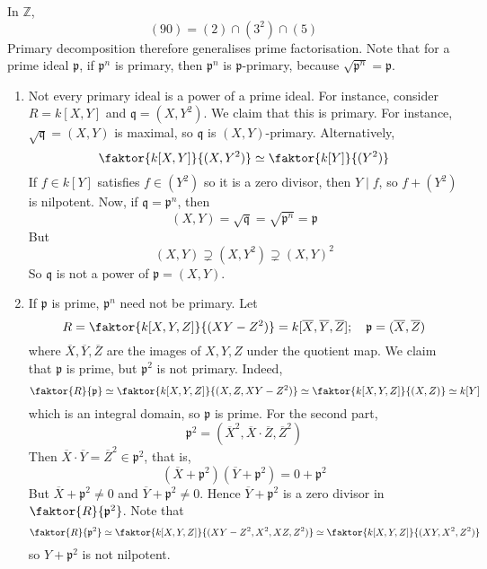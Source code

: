 In \( \mathbb Z \),
\[ (90) = (2) \cap (3^2) \cap (5) \]
Primary decomposition therefore generalises prime factorisation.
Note that for a prime ideal \( \mathfrak p \), if \( \mathfrak p^n \) is primary, then \( \mathfrak p^n \) is \( \mathfrak p \)-primary, because \( \sqrt{\mathfrak p^n} = \mathfrak p \).
\begin{example}
    \begin{enumerate}
        \item Not every primary ideal is a power of a prime ideal.
        For instance, consider \( R = k[X, Y] \) and \( \mathfrak q = (X, Y^2) \).
        We claim that this is primary.
        For instance, \( \sqrt{\mathfrak q} = (X, Y) \) is maximal, so \( \mathfrak q \) is \( (X, Y) \)-primary.
        Alternatively,
        \[ \faktor{k[X, Y]}{(X, Y^2)} \simeq \faktor{k[Y]}{(Y^2)} \]
        If \( f \in k[Y] \) satisfies \( f \in (Y^2) \) so it is a zero divisor, then \( Y \mid f \), so \( f + (Y^2) \) is nilpotent.
        Now, if \( \mathfrak q = \mathfrak p^n \), then
        \[ (X, Y) = \sqrt{\mathfrak q} = \sqrt{\mathfrak p^n} = \mathfrak p \]
        But
        \[ (X, Y) \supsetneq (X, Y^2) \supsetneq (X, Y)^2 \]
        So \( \mathfrak q \) is not a power of \( \mathfrak p = (X, Y) \).
        \item If \( \mathfrak p \) is prime, \( \mathfrak p^n \) need not be primary.
        Let
        \[ R = \faktor{k[X, Y, Z]}{(XY - Z^2)} = k[\overline X, \overline Y, \overline Z];\quad \mathfrak p = (\overline X, \overline Z) \]
        where \( \overline X, \overline Y, \overline Z \) are the images of \( X, Y, Z \) under the quotient map.
        We claim that \( \mathfrak p \) is prime, but \( \mathfrak p^2 \) is not primary.
        Indeed,
        \[ \faktor{R}{\mathfrak p} \simeq \faktor{k[X, Y, Z]}{(X, Z, XY - Z^2)} \simeq \faktor{k[X, Y, Z]}{(X, Z)} \simeq k[Y] \]
        which is an integral domain, so \( \mathfrak p \) is prime.
        For the second part,
        \[ \mathfrak p^2 = (\overline X^2, \overline X \cdot \overline Z, \overline Z^2) \]
        Then \( \overline X \cdot \overline Y = \overline Z^2 \in \mathfrak p^2 \), that is,
        \[ (\overline X + \mathfrak p^2)(\overline Y + \mathfrak p^2) = 0 + \mathfrak p^2 \]
        But \( \overline X + \mathfrak p^2 \neq 0 \) and \( \overline Y + \mathfrak p^2 \neq 0 \).
        Hence \( \overline Y + \mathfrak p^2 \) is a zero divisor in \( \faktor{R}{\mathfrak p^2} \).
        Note that
        \[ \faktor{R}{\mathfrak p^2} \simeq \faktor{k[X, Y, Z]}{(XY - Z^2, X^2, XZ, Z^2)} \simeq \faktor{k[X, Y, Z]}{(XY, X^2, Z^2)} \]
        so \( Y + \mathfrak p^2 \) is not nilpotent.
    \end{enumerate}
\end{example}
